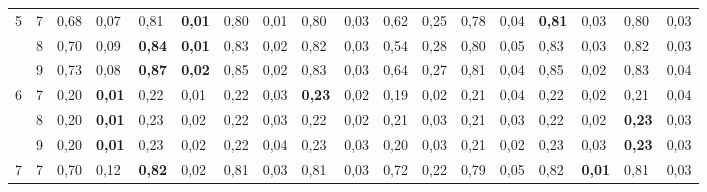 \documentclass[conference]{IEEEtran}
\begin{document}
\begin{table}[]
\begin{tabular}{|cl|ll|ll|ll|ll|ll|ll|ll|ll|}
		\multicolumn{1}{|c|}{\multirow{3}{*}{5}} & 7 & \multicolumn{1}{l|}{0,68} & 0,07 & \multicolumn{1}{l|}{0,81} & \textbf{0,01} & \multicolumn{1}{l|}{0,80} & 0,01 & \multicolumn{1}{l|}{0,80} & 0,03 & \multicolumn{1}{l|}{0,62} & 0,25 & \multicolumn{1}{l|}{0,78} & 0,04 & \multicolumn{1}{l|}{\textbf{0,81}} & 0,03 & \multicolumn{1}{l|}{0,80} & 0,03 \\ \cline{2-18} 
		\multicolumn{1}{|c|}{} & 8 & \multicolumn{1}{l|}{0,70} & 0,09 & \multicolumn{1}{l|}{\textbf{0,84}} & \textbf{0,01} & \multicolumn{1}{l|}{0,83} & 0,02 & \multicolumn{1}{l|}{0,82} & 0,03 & \multicolumn{1}{l|}{0,54} & 0,28 & \multicolumn{1}{l|}{0,80} & 0,05 & \multicolumn{1}{l|}{0,83} & 0,03 & \multicolumn{1}{l|}{0,82} & 0,03 \\ \cline{2-18} 
		\multicolumn{1}{|c|}{} & 9 & \multicolumn{1}{l|}{0,73} & 0,08 & \multicolumn{1}{l|}{\textbf{0,87}} & \textbf{0,02} & \multicolumn{1}{l|}{0,85} & 0,02 & \multicolumn{1}{l|}{0,83} & 0,03 & \multicolumn{1}{l|}{0,64} & 0,27 & \multicolumn{1}{l|}{0,81} & 0,04 & \multicolumn{1}{l|}{0,85} & 0,02 & \multicolumn{1}{l|}{0,83} & 0,04 \\ \hline
		\multicolumn{1}{|c|}{\multirow{3}{*}{6}} & 7 & \multicolumn{1}{l|}{0,20} & \textbf{0,01} & \multicolumn{1}{l|}{0,22} & 0,01 & \multicolumn{1}{l|}{0,22} & 0,03 & \multicolumn{1}{l|}{\textbf{0,23}} & 0,02 & \multicolumn{1}{l|}{0,19} & 0,02 & \multicolumn{1}{l|}{0,21} & 0,04 & \multicolumn{1}{l|}{0,22} & 0,02 & \multicolumn{1}{l|}{0,21} & 0,04 \\ \cline{2-18} 
		\multicolumn{1}{|c|}{} & 8 & \multicolumn{1}{l|}{0,20} & \textbf{0,01} & \multicolumn{1}{l|}{0,23} & 0,02 & \multicolumn{1}{l|}{0,22} & 0,03 & \multicolumn{1}{l|}{0,22} & 0,02 & \multicolumn{1}{l|}{0,21} & 0,03 & \multicolumn{1}{l|}{0,21} & 0,03 & \multicolumn{1}{l|}{0,22} & 0,02 & \multicolumn{1}{l|}{\textbf{0,23}} & 0,03 \\ \cline{2-18} 
		\multicolumn{1}{|c|}{} & 9 & \multicolumn{1}{l|}{0,20} & \textbf{0,01} & \multicolumn{1}{l|}{0,23} & 0,02 & \multicolumn{1}{l|}{0,22} & 0,04 & \multicolumn{1}{l|}{0,23} & 0,03 & \multicolumn{1}{l|}{0,20} & 0,03 & \multicolumn{1}{l|}{0,21} & 0,02 & \multicolumn{1}{l|}{0,23} & 0,03 & \multicolumn{1}{l|}{\textbf{0,23}} & 0,03 \\ \hline
		\multicolumn{1}{|c|}{\multirow{3}{*}{7}} & 7 & \multicolumn{1}{l|}{0,70} & 0,12 & \multicolumn{1}{l|}{\textbf{0,82}} & 0,02 & \multicolumn{1}{l|}{0,81} & 0,03 & \multicolumn{1}{l|}{0,81} & 0,03 & \multicolumn{1}{l|}{0,72} & 0,22 & \multicolumn{1}{l|}{0,79} & 0,05 & \multicolumn{1}{l|}{0,82} & \textbf{0,01} & \multicolumn{1}{l|}{0,81} & 0,03 \\ \cline{2-18} 

\end{tabular}
\end{table}
\end{document}

